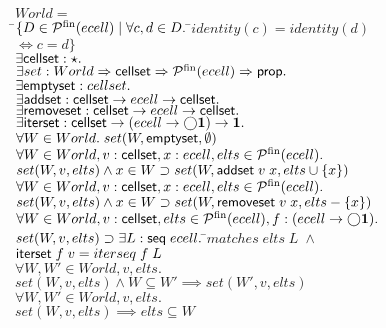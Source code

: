\begin{tabbing}
$World = $ \\
\;\;\;\;\=$\{D \in \mathcal{P}^{\mathrm{fin}}(ecell)\;|\;\forall c,d \in D.\;$\=$identity(c) = identity(d)$\\
        \>                                                      \>$\iff c = d\}$\\[1em]

$\exists \mathsf{cellset} : \star.$ \\
$\exists set : World \Rightarrow \mathsf{cellset} \Rightarrow \mathcal{P}^{\mathrm{fin}}(ecell) \Rightarrow \mathsf{prop}.$ \\
$\exists \mathsf{emptyset}    : cellset.$ \\
$\exists \mathsf{addset}      : \mathsf{cellset} \to ecell \to \mathsf{cellset}.$ \\
$\exists \mathsf{removeset}   : \mathsf{cellset} \to ecell \to \mathsf{cellset}.$ \\
$\exists \mathsf{iterset}     : \mathsf{cellset} \to (ecell \to \bigcirc{\mathbf{1}}) \to \mathbf{1}.$\\[1em]

$\forall W \in World.\; set(W, \mathsf{emptyset}, \emptyset)$ \\[1em]


$\forall W \in World, v : \mathsf{cellset}, x : ecell, elts \in \mathcal{P}^{\mathrm{fin}}(ecell).$ \\ 
\> $set(W, v, elts) \land x \in W \supset set(W, \mathsf{addset}\;v\;x, elts \cup \{{x}\})$ \\[1em]


$\forall W \in World, v : \mathsf{cellset}, x : ecell, elts \in \mathcal{P}^{\mathrm{fin}}(ecell).$ \\ 
\> $set(W, v, elts) \land x \in W \supset set(W, \mathsf{removeset}\;v\;x, elts - \{{x}\})$ \\[1em]


$\forall W \in World, v : \mathsf{cellset}, elts \in \mathcal{P}^{\mathrm{fin}}(ecell), 
         f : (ecell \to \bigcirc{\mathbf{1}}).$ \\ 
\> $set(W, v, elts) \supset \exists L : \mathsf{seq}\;{ecell}.\;$\=$matches\;elts\;L\; \land$ \\
\>                                \>$\mathsf{iterset}\;f\;v = iterseq\;f\;L$ \\[1em]


$\forall W, W' \in World, v, elts.$ \\
\>$set(W,v,elts) \land W \subseteq W' \implies set(W',v, elts)$\\[1em]

$\forall W, W' \in World, v, elts.$ \\
\>$set(W, v, elts) \implies elts \subseteq W$ \\[1em]


\end{tabbing}
